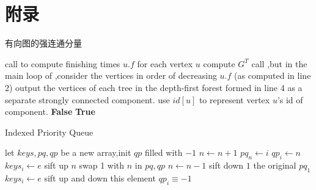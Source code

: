 \documentclass[UTF8,a4paper]{ctexart}
\begin{document}
\newpage


\newpage

\section{附录}
\begin{algorithm}
    \caption{有向图的强连通分量}\label{scc}
    \begin{algorithmic}[1] %
        \State call  to compute finishing times {$u.f$} for each vertex {$u$}
        \State compute {$G^T$}
        \State call ,but in the main loop of ,consider the vertices in order of decreasing {$u.f$} (as computed in line 2)
        \State output the vertices of each tree in the depth-first forest formed in line 4 as a separate strongly connected component. use $id[u]$ to represent vertex $u$'s id of component.
        \EndFunction
        \State
        \State {}
        \EndFunction
        \State
        \State {}
        \EndFunction
        \State
        \State \Return \textbf{False}
        \EndIf
        \EndFor
        \State \Return \textbf{True}
        \EndFunction
    \end{algorithmic}
\end{algorithm}

\begin{algorithm}
    \caption{Indexed Priority Queue}\label{algoindexedpq}
    \begin{algorithmic}[1] %
        \State let $keys,pq,qp$ be a new array,init $qp$ filled with $-1$
        \EndFunction
        \State
        \State $n\gets n+1$
        \State $pq_n \gets i$
        \State $qp_i \gets n$
        \State $keys_i \gets e$
        \State sift up $n$
        \EndFunction
        \State
        \State {}
        \EndFunction
        \State
        \State swap 1 with $n$ in $pq,qp$
        \State $n\gets n - 1$
        \State sift down $1$
        \State \Return the original $pq_1$
        \EndFunction
        \State
        \State $keys_i\gets e$
        \State sift up and down this element
        \EndFunction
        \State
        \State \Return $qp_i\equiv -1$
        \EndFunction
    \end{algorithmic}
\end{algorithm}
\end{document}
